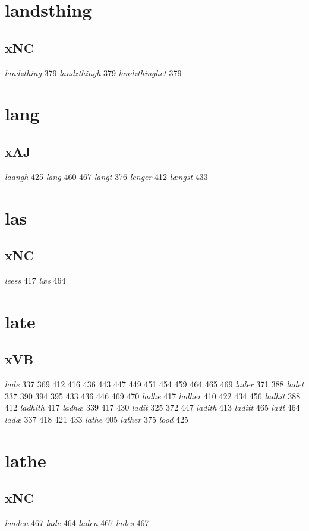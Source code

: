 \documentclass[a4paper,twocolumn]{article}
\begin{document}
\section{landsthing}
\label{sec:orgec7d25b}
\subsection{xNC}
\label{sec:orga5184e3}
\emph{landzthing} 379 \emph{landzthingh} 379 \emph{landzthinghet} 379 
\section{lang}
\label{sec:orga37fee6}
\subsection{xAJ}
\label{sec:org071b76f}
\emph{laangh} 425 \emph{lang} 460 467 \emph{langt} 376 \emph{lenger} 412 \emph{længst} 433 
\section{las}
\label{sec:org8bcfc24}
\subsection{xNC}
\label{sec:orga444238}
\emph{leess} 417 \emph{læs} 464 
\section{late}
\label{sec:orgad44f4e}
\subsection{xVB}
\label{sec:orgfb85e4a}
\emph{lade} 337 369 412 416 436 443 447 449 451 454 459 464 465 469 \emph{lader} 371 388 \emph{ladet} 337 390 394 395 433 436 446 469 470 \emph{ladhe} 417 \emph{ladher} 410 422 434 456 \emph{ladhit} 388 412 \emph{ladhith} 417 \emph{ladhæ} 339 417 430 \emph{ladit} 325 372 447 \emph{ladith} 413 \emph{laditt} 465 \emph{ladt} 464 \emph{ladæ} 337 418 421 433 \emph{lathe} 405 \emph{lather} 375 \emph{lood} 425 
\section{lathe}
\label{sec:org126e3b4}
\subsection{xNC}
\label{sec:org8386a2f}
\emph{laaden} 467 \emph{lade} 464 \emph{laden} 467 \emph{lades} 467 
\end{document}
